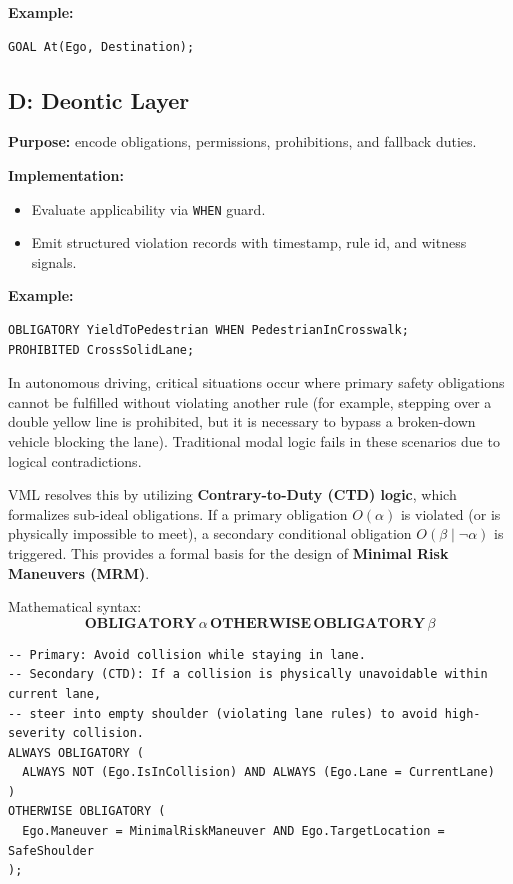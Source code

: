 \documentclass[11pt,a4paper]{article}
\begin{document}
\textbf{Example:}
\begin{lstlisting}
GOAL At(Ego, Destination);
\end{lstlisting}

\subsection{D: Deontic Layer}
\textbf{Purpose:} encode obligations, permissions, prohibitions, and fallback duties.

\textbf{Implementation:}
\begin{itemize}[leftmargin=*]
  \item Evaluate applicability via \texttt{WHEN} guard.
  \item Emit structured violation records with timestamp, rule id, and witness signals.
\end{itemize}

\textbf{Example:}
\begin{lstlisting}
OBLIGATORY YieldToPedestrian WHEN PedestrianInCrosswalk;
PROHIBITED CrossSolidLane;
\end{lstlisting}

In autonomous driving, critical situations occur where primary safety obligations cannot be fulfilled without violating another rule (for example, stepping over a double yellow line is prohibited, but it is necessary to bypass a broken-down vehicle blocking the lane). Traditional modal logic fails in these scenarios due to logical contradictions.

VML resolves this by utilizing \textbf{Contrary-to-Duty (CTD) logic}, which formalizes sub-ideal obligations. If a primary obligation $O(\alpha)$ is violated (or is physically impossible to meet), a secondary conditional obligation $O(\beta \mid \neg \alpha)$ is triggered. This provides a formal basis for the design of \textbf{Minimal Risk Maneuvers (MRM)}.

Mathematical syntax:
\[
\mathbf{OBLIGATORY} \, \alpha \, \mathbf{OTHERWISE} \, \mathbf{OBLIGATORY} \, \beta
\]

\begin{lstlisting}
-- Primary: Avoid collision while staying in lane.
-- Secondary (CTD): If a collision is physically unavoidable within current lane, 
-- steer into empty shoulder (violating lane rules) to avoid high-severity collision.
ALWAYS OBLIGATORY (
  ALWAYS NOT (Ego.IsInCollision) AND ALWAYS (Ego.Lane = CurrentLane)
)
OTHERWISE OBLIGATORY (
  Ego.Maneuver = MinimalRiskManeuver AND Ego.TargetLocation = SafeShoulder
);
\end{lstlisting}
\end{document}
